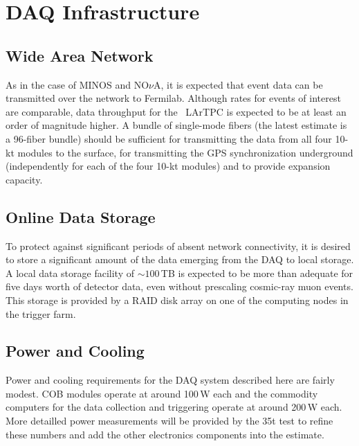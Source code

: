 \section{DAQ Infrastructure }
\label{sec:daq_infrastructure}

\subsection{Wide Area Network}

As in the case of MINOS and NO$\nu$A, it is expected that event data
can be transmitted over the network to Fermilab.  Although rates for
events of interest are comparable, data throughput for the \LBNE\
LArTPC is expected to be at least an order of magnitude higher.  A
bundle of single-mode fibers (the latest estimate is a 96-fiber bundle)
should be sufficient for transmitting the data from all four 10-kt
modules to the surface, for transmitting the GPS synchronization
underground (independently for each of the four 10-kt modules) and to provide
expansion capacity.

\subsection{Online Data Storage}

To protect against significant periods of absent network connectivity,
it is desired to store a significant amount of the data emerging from
the DAQ to local storage.  A local data storage facility of $\sim
100\,$TB is expected to be more than adequate for five days worth of
detector data, even without prescaling cosmic-ray muon events.  This
storage is provided by a RAID disk array on one of the computing nodes
in the trigger farm.

\subsection{Power and Cooling}

Power and cooling requirements for the DAQ system described here are
fairly modest.  COB modules operate at around 100\,W each and the
commodity computers for the data collection and triggering operate at around
200\,W each.  More detailled power measurements will be provided by the
35t test to refine these numbers and add the other electronics
components into the estimate.

